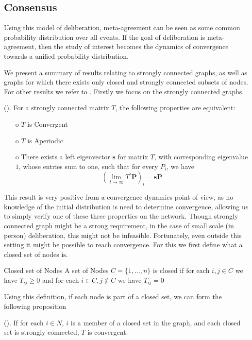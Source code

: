 \subsection{Consensus}
\label{sub: concensus DeGroot}
Using this model of deliberation, meta-agreement can be seen as some common probability distribution over all events. If the goal of deliberation is meta-agreement, then the study of interest becomes the dynamics of convergence towards a unified probability distribution.

We present a summary of results relating to strongly connected graphs, as well as graphs for which there exists only closed and strongly connected subsets of nodes. For other results we refer to \citet{Golub_Jackson_2010}. Firstly we focus on the strongly connected graphs.

\begin{proposition}{(\citet{Golub_Jackson_2010}).}
	For a strongly connected matrix \(T\), the following properties are equivalent:
	\begin{itemize}
		\item[o] \(T\) is Convergent
		\item[o] \(T\) is Aperiodic
		\item[o] There exists a left eigenvector \(\boldsymbol{s}\) for matrix \(T\), with corresponding eigenvalue \(1\), whose entries sum to one, such that for every $P_i$, we have
			\[\left(\lim_{t\to \infty}T^{t} \boldsymbol{P}\right)_{i} = \boldsymbol{s}\boldsymbol{P}\]
	\end{itemize}
\end{proposition}

This result is very positive from a convergence dynamics point of view, as no knowledge of the initial distribution is need to determine convergence, allowing us to simply verify one of these three properties on the network. Though strongly connected graph might be a strong requirement, in the case of small scale (in person) deliberation, this might not be infeasible. Fortunately, even outside this setting it might be possible to reach convergence. For this we first define what a closed set of nodes is.

\begin{definition}{Closed set of Nodes}{}
	A set of Nodes \(C = \{1, \dots, n\}\) is closed if for each \(i,j \in C\) we have $T_{ij} \geq 0$ and for each \(i \in C, j \notin C\) we have \(T_{ij} = 0\)
\end{definition}

Using this definition, if each node is part of a closed set, we can form the following proposition

\begin{proposition}{(\citet{Golub_Jackson_2010}).}
	If for each \(i \in N\), \(i\) is a member of a closed set in the graph, and each closed set is strongly connected, \(T\) is convergent.
\end{proposition}









